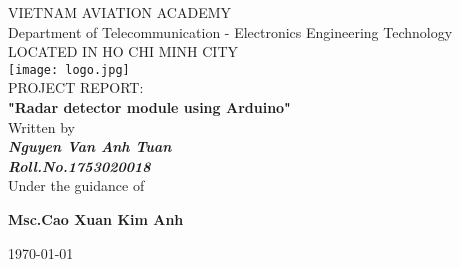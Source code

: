 \documentclass[13pt,a4paper]{report}
\begin{document}
    \begin{titlepage}
        \centering
        
        \LARGE{\textsc{VIETNAM AVIATION ACADEMY}}\\
        \vspace{3mm}
        \normalsize{Department of Telecommunication - Electronics Engineering Technology} \\
        \vspace{3mm}
        \large{LOCATED IN HO CHI MINH CITY} \\
        \vspace{3mm}
        \texttt{[image: logo.jpg]} \\
        \vspace{3mm}
        \normalsize{PROJECT REPORT: } \\ 
        \vspace{15mm}
        \huge{\textbf{"Radar detector module using Arduino"}} \\
        \vspace{20mm}
        \normalsize{Written by} \\
        \vspace{3mm}
        \large{\textbf{\textit{Nguyen Van Anh Tuan}}} \\
        \vspace{3mm}
        \textbf{{\large{\textit{Roll.No.1753020018}}}} \\
        \vspace{15mm}
        \large{Under the guidance of} \\ 
        \vspace{10mm}
        \centerline{\textbf{\large{Msc.Cao Xuan Kim Anh}}}
        \vspace{6cm}
        \centerline{\today}
    \end{titlepage}
\end{document}
